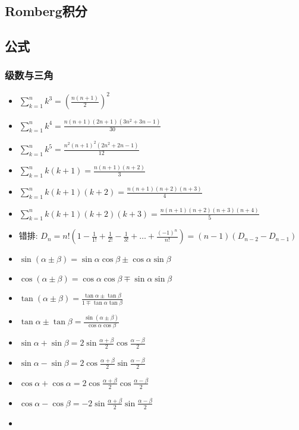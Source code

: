 \documentclass[landscape, twocolumn, 8pt, a4paper, twoside]{extarticle}
\begin{document}


\subsection{Romberg积分}


\subsection{公式}
\subsubsection{级数与三角}
\begin{itemize}
\item
  $\sum_{k=1}^{n}k^3 = (\frac{n(n+1)}{2})^2  $
\item
  $\sum_{k=1}^{n}k^4 = \frac{n(n+1)(2n+1)(3n^2+3n-1)}{30}  $
\item
  $\sum_{k=1}^{n}k^5 = \frac{n^2(n+1)^2(2n^2+2n-1)}{12}  $
\item
  $\sum_{k=1}^{n}k(k+1) = \frac{n(n+1)(n+2)}{3}  $
\item
  $\sum_{k=1}^{n}k(k+1)(k+2) = \frac{n(n+1)(n+2)(n+3)}{4} $
\item
  $\sum_{k=1}^{n}k(k+1)(k+2)(k+3) = \frac{n(n+1)(n+2)(n+3)(n+4)}{5} $
\item 错排:
  $D_n = n!(1-\frac{1}{1!}+\frac{1}{2!}-\frac{1}{3!}+\ldots+\frac{(-1)^n}{n!}) = (n-1)(D_{n-2}-D_{n-1})$
\item
  $\sin(\alpha \pm \beta) = \sin\alpha\cos\beta \pm \cos\alpha\sin\beta $
\item
  $\cos(\alpha \pm \beta) = \cos\alpha\cos\beta \mp \sin\alpha\sin\beta $
\item
  $\tan(\alpha \pm \beta) = \frac{\tan\alpha \pm \tan\beta}{1 \mp \tan\alpha\tan\beta} $
\item
  $\tan\alpha \pm \tan\beta = \frac{\sin(\alpha \pm \beta)}{\cos\alpha\cos\beta} $
\item
  $\sin\alpha+\sin\beta = 2\sin\frac{\alpha+\beta}{2}\cos\frac{\alpha-\beta}{2} $
\item
  $\sin\alpha-\sin\beta = 2\cos\frac{\alpha+\beta}{2}\sin\frac{\alpha-\beta}{2} $
\item
  $\cos\alpha+\cos\alpha = 2\cos\frac{\alpha+\beta}{2}\cos\frac{\alpha-\beta}{2} $
\item
  $\cos\alpha-\cos\beta = -2\sin\frac{\alpha+\beta}{2}\sin\frac{\alpha-\beta}{2} $
\item

\end{itemize}
\end{document}
